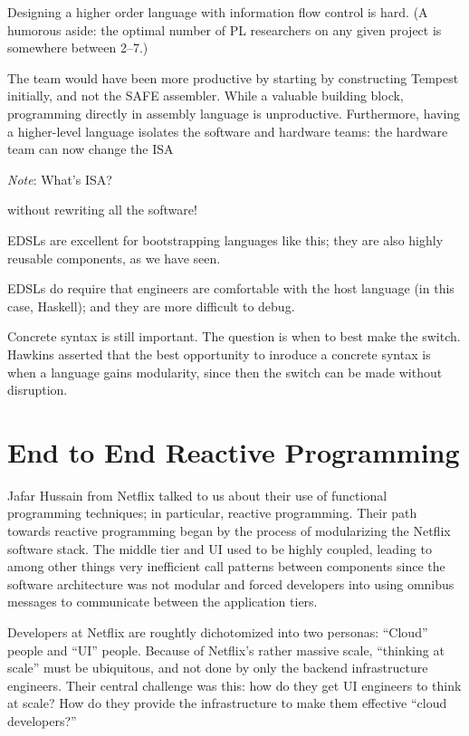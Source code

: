 \documentclass{jfp1}
\newenvironment{ipar}[0]%
 {\begin{list}{}%
 {\setlength{\leftmargin}{1cm}}%
\item[]%
 }
 {\end{list}}
\newcommand{\note}[1]{ \begin{ipar}  {\color{Gray} \textit{Note}: #1} \end{ipar}}
\begin{document}
\begin{itemize}

\item Designing a higher order language with information flow control
is hard. (A humorous aside: the optimal number of PL researchers on
any given project is somewhere between 2--7.)

\item The team would have been more productive by starting by constructing
Tempest initially, and not the SAFE assembler. While a valuable building block,
programming directly in assembly language is unproductive. Furthermore,
having a higher-level language isolates the software and hardware teams:
the hardware team can now change the ISA \note{What's ISA?} without rewriting all the software!

\item EDSLs are excellent for bootstrapping languages like this; they are also 
highly reusable components, as we have seen.

\item EDSLs do require that engineers are comfortable with the host language
(in this case, Haskell); and they are more difficult to debug.

\item Concrete syntax is still important. The question is when to best make
the switch. Hawkins asserted that the best opportunity to inroduce a concrete
syntax is when a language gains modularity, since then the switch can be made
without disruption.

\end{itemize}

\section{End to End Reactive Programming}


Jafar Hussain from Netflix talked to us about their use of functional
programming techniques; in particular, reactive programming. Their
path towards reactive programming began by the process of
modularizing the Netflix software stack. The middle tier and UI
used to be highly coupled, leading to among other things very
inefficient call patterns between components since the software
architecture was not modular and forced developers into using
omnibus messages to communicate between the application tiers.

Developers at Netflix are roughtly dichotomized into two personas:
``Cloud'' people and ``UI'' people. Because of Netflix's rather
massive scale, ``thinking at scale'' must be ubiquitous, and not done
by only the backend infrastructure engineers. Their central challenge
was this: how do they get UI engineers to think at scale? How do they
provide the infrastructure to make them effective ``cloud
developers?''
\end{document}

